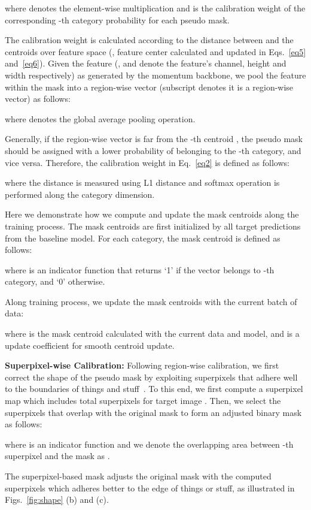 \documentclass[10pt,twocolumn,letterpaper]{article}
\begin{document}
where  denotes the element-wise multiplication and  is the calibration weight of the corresponding -th category probability for each pseudo mask. 

The calibration weight  is calculated according to the distance between  and the centroids  over feature space (, feature center calculated and updated in Eqs.~\ref{eq5} and~\ref{eq6}). Given the feature  (,  and  denote the feature's channel, height and width respectively) as generated by the momentum backbone, we pool the feature within the mask  into a region-wise vector  (subscript  denotes it is a region-wise vector) as follows:


where  denotes the global average pooling operation.

Generally, if the region-wise vector  is far from the -th centroid , the pseudo mask  should be assigned with a lower probability of belonging to the -th category, and vice versa. Therefore, the calibration weight in Eq.~\ref{eq2} is defined as follows:

where the distance is measured using L1 distance and softmax operation is performed along the category dimension.

Here we demonstrate how we compute and update the mask centroids along the training process. The mask centroids are first initialized by all target predictions from the baseline model. For each category, the mask centroid  is defined as follows:

where  is an indicator function that returns `1' if the vector  belongs to -th category, and `0' otherwise.

Along training process, we update the mask centroids with the current batch of data:

where  is the mask centroid calculated with the current data and model, and  is a update coefficient for smooth centroid update.

\noindent \textbf{Superpixel-wise Calibration:}
Following region-wise calibration, we first correct the shape of the pseudo mask by exploiting superpixels that adhere well to the boundaries of things and stuff~\cite{achanta2012slic}.
To this end, we first compute a superpixel map  which includes total  superpixels  for target image . Then, we select the superpixels that overlap with the original mask  to form an adjusted binary mask  as follows:

where  is an indicator function and we denote the overlapping area between -th superpixel and the mask  as .

The superpixel-based mask  adjusts the original mask  with the computed superpixels which adheres better to the edge of things or stuff, as illustrated in Figs.~\ref{fig:shape} (b) and (c).
\end{document}
